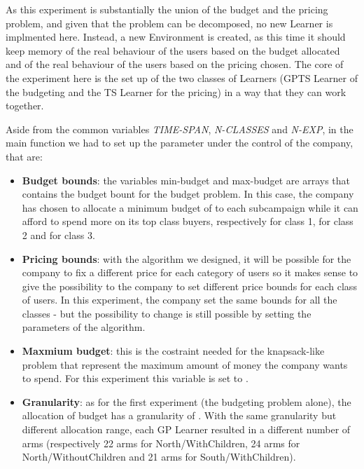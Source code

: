 As this experiment is substantially the union of the budget and the pricing problem, and given that the problem can be decomposed, no new Learner is implmented here. Instead, a new Environment is created, as this time it should keep memory of the real behaviour of the users based on the budget allocated and of the real behaviour of the users based on the pricing chosen. The core of the experiment here is the set up of the two classes of Learners (GPTS Learner of the budgeting and the TS Learner for the pricing) in a way that they can work together.

Aside from the common variables \textit{TIME-SPAN}, \textit{N-CLASSES} and \textit{N-EXP}, in the main function we had to set up the parameter under the control of the company, that are:

\begin{itemize}
	\item \textbf{Budget bounds}: the variables min-budget and max-budget are arrays that contains the budget bount for the budget problem. In this case, the company has chosen to allocate a minimum budget of  to each subcampaign while it can afford to spend more on its top class buyers, respectively  for class 1,  for class 2 and  for class 3.
	\\\item \textbf{Pricing bounds}: with the algorithm we designed, it will be possible for the company to fix a different price for each category of users so it makes sense to give the possibility to the company to set different price bounds for each class of users. In this experiment, the company set the same bounds for all the classes - but the possibility to change is still possible by setting the parameters of the algorithm.
	\item \textbf{Maxmium budget}: this is the costraint needed for the knapsack-like problem that represent the maximum amount of money the company wants to spend. For this experiment this variable is set to .
	\item \textbf{Granularity}: as for the first experiment (the budgeting problem alone), the allocation of budget has a granularity of . With the same granularity but different allocation range, each GP Learner resulted in a different number of arms (respectively 22 arms for North/WithChildren, 24 arms for North/WithoutChildren and 21 arms for South/WithChildren).
\end{itemize}
